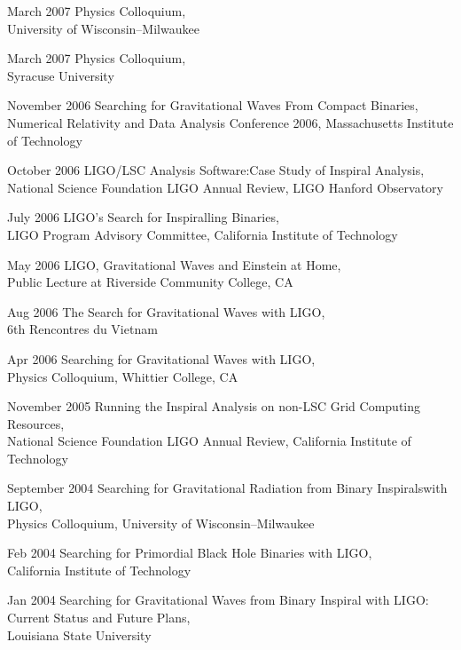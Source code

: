 \documentclass{cv}
\begin{document}
\begin{entry}
\item[March 2007] {Physics Colloquium},\\
{\small University of Wisconsin--Milwaukee}

\item[March 2007] {Physics Colloquium},\\
{\small Syracuse University}

\item[November 2006]{ Searching for Gravitational Waves From Compact
Binaries},\\
{\small Numerical Relativity and Data Analysis Conference 2006, Massachusetts Institute of Technology}

\item[October 2006] {LIGO/LSC Analysis Software:Case Study of Inspiral Analysis},\\
{\small National Science Foundation LIGO Annual Review, LIGO Hanford
Observatory}

\item[July 2006] {LIGO's Search for Inspiralling Binaries},\\
{\small LIGO Program Advisory Committee, California Institute of Technology}

\item[May 2006] {LIGO, Gravitational Waves and Einstein at Home},\\
{\small Public Lecture at Riverside Community College, CA}

\item[Aug 2006] {The Search for Gravitational Waves with LIGO},\\
{\small 6th Rencontres du Vietnam}

\item[Apr 2006] {Searching for Gravitational Waves with LIGO},\\
{\small Physics Colloquium, Whittier College, CA}

\item[November 2005] {Running the Inspiral Analysis on non-LSC Grid Computing Resources},\\
{\small National Science Foundation LIGO Annual Review, California Institute
of Technology}

\item[September 2004] {Searching for Gravitational Radiation from Binary Inspiralswith LIGO},\\
{\small Physics Colloquium, University of Wisconsin--Milwaukee}

\item[Feb 2004] {Searching for Primordial Black Hole Binaries with LIGO},\\
{\small California Institute of Technology}

\item[Jan 2004] {Searching for Gravitational Waves from Binary Inspiral 
with LIGO: Current Status and Future Plans},\\
{\small Louisiana State University}
\end{entry}
\end{document}

